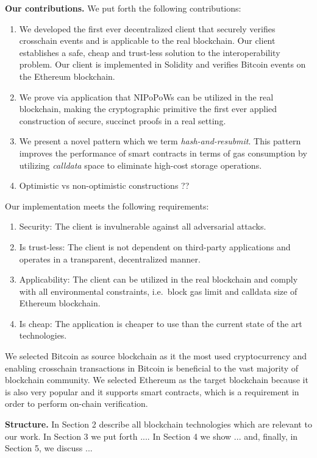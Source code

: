 \textbf{Our contributions.} We put forth the following contributions:
\begin{enumerate}
\item We developed the first ever decentralized client that securely verifies
crosschain events and is applicable to the real blockchain. Our client
establishes a safe, cheap and trust-less solution to the interoperability
problem. Our client is implemented in Solidity and verifies Bitcoin events
on the Ethereum blockchain.
\item We prove via application that NIPoPoWs can be utilized in the real
blockchain, making the cryptographic primitive the first ever applied
construction of secure, succinct proofs in a real setting.
\item We present a novel pattern which we term \emph{hash-and-resubmit}. This
pattern improves the performance of smart contracts in terms of gas consumption
by utilizing \emph{calldata} space to eliminate high-cost storage operations.
\item Optimistic vs non-optimistic constructions ??
\end{enumerate}

\bigbreak
Our implementation meets the following requirements:
\begin{enumerate}
\item Security: The client is invulnerable against all adversarial attacks.
\item Is trust-less: The client is not dependent on third-party applications
and operates in a transparent, decentralized manner.
\item Applicability: The client can be utilized in the real blockchain and
comply with all environmental constraints, i.e.\ block gas limit and calldata
size of Ethereum blockchain.
\item Is cheap: The application is cheaper to use than the current state of the
art technologies.
\end{enumerate}

We selected Bitcoin as source blockchain as it the most used cryptocurrency and
enabling crosschain transactions in Bitcoin is beneficial to the vast majority
of blockchain community. We selected Ethereum as the target blockchain because
it is also very popular and it supports smart contracts, which is a requirement
in order to perform on-chain verification.

\noindent

\textbf{Structure.} In Section 2 describe all blockchain technologies which are
relevant to our work. In Section 3 we put forth .... In Section 4 we show
... and, finally, in Section 5, we discuss ...


